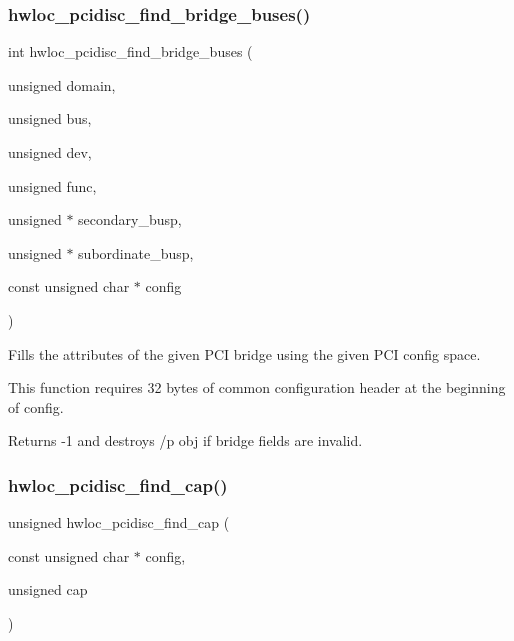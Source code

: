 \subsubsection{\texorpdfstring{hwloc\+\_\+pcidisc\+\_\+find\+\_\+bridge\+\_\+buses()}{hwloc\_pcidisc\_find\_bridge\_buses()}}
{\footnotesize\ttfamily int hwloc\+\_\+pcidisc\+\_\+find\+\_\+bridge\+\_\+buses (\begin{DoxyParamCaption}\item[{unsigned}]{domain,  }\item[{unsigned}]{bus,  }\item[{unsigned}]{dev,  }\item[{unsigned}]{func,  }\item[{unsigned $\ast$}]{secondary\+\_\+busp,  }\item[{unsigned $\ast$}]{subordinate\+\_\+busp,  }\item[{const unsigned char $\ast$}]{config }\end{DoxyParamCaption})}



Fills the attributes of the given P\+CI bridge using the given P\+CI config space. 

This function requires 32 bytes of common configuration header at the beginning of config.

Returns -\/1 and destroys /p obj if bridge fields are invalid. \mbox{\label{a00232_ga706f71cfea09d547d2cbafa642d6e03b}} 
\subsubsection{\texorpdfstring{hwloc\+\_\+pcidisc\+\_\+find\+\_\+cap()}{hwloc\_pcidisc\_find\_cap()}}
{\footnotesize\ttfamily unsigned hwloc\+\_\+pcidisc\+\_\+find\+\_\+cap (\begin{DoxyParamCaption}\item[{const unsigned char $\ast$}]{config,  }\item[{unsigned}]{cap }\end{DoxyParamCaption})}



